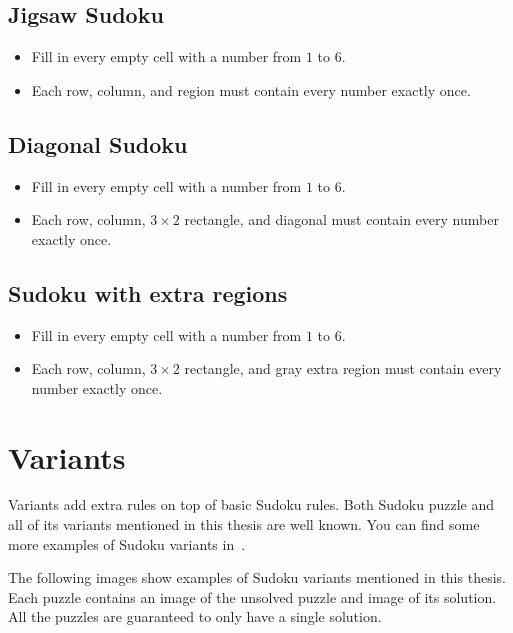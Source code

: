 \subsection*{Jigsaw Sudoku}
\begin{itemize}
    \item Fill in every empty cell with a number from $1$ to $6$.
    \item Each row, column, and region must contain every number exactly once.
\end{itemize}

\subsection*{Diagonal Sudoku}
\begin{itemize}
    \item Fill in every empty cell with a number from $1$ to $6$.
    \item Each row, column, $3 \times 2$ rectangle, and diagonal must contain every number exactly once.
\end{itemize}

\subsection*{Sudoku with extra regions}
\begin{itemize}
    \item Fill in every empty cell with a number from $1$ to $6$.
    \item Each row, column, $3 \times 2$ rectangle, and gray extra region must contain every number exactly once.
\end{itemize}

\section{Variants}\label{sec:variant-rules}

Variants add extra rules on top of basic Sudoku rules.
Both Sudoku puzzle and all of its variants mentioned in this thesis are well known.
You can find some more examples of Sudoku variants in~\cite{logika2024}.

The following images show examples of Sudoku variants mentioned in this thesis.
Each puzzle contains an image of the unsolved puzzle and image of its solution.
All the puzzles are guaranteed to only have a single solution.


